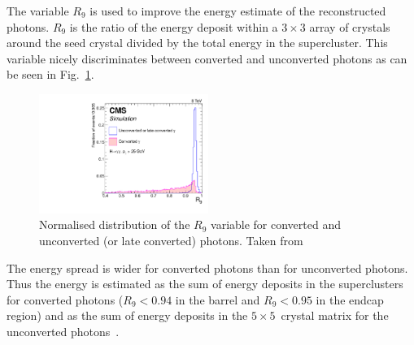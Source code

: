 The variable $R_9$ is used to improve the energy estimate of the reconstructed photons.
$R_9$ is the ratio of the energy deposit within a $3\times 3$ array of crystals around the seed crystal divided by the total energy in the supercluster.
This variable nicely discriminates between converted and unconverted photons as can be seen in Fig.~\ref{fig:PhotonR9}.
\begin{figure}[!t]
  \centering
      \includegraphics[width=0.49\textwidth]{figures/experiment/ObjectReconstruction/convUnconvR9Linear}
      \caption{Normalised distribution of the $R_9$ variable for converted and unconverted (or late converted) photons. Taken from~\cite{bib:CMS:PhotonIdentification_8TeV}}  
  \label{fig:PhotonR9}
\end{figure}
The energy spread is wider for converted photons than for unconverted photons.
Thus the energy is estimated as the sum of energy deposits in the superclusters for converted photons ($R_9<0.94$ in the barrel and $R_9<0.95$ in the endcap region) and as the sum of energy deposits in the $5\times5$~crystal matrix for the unconverted photons~\cite{bib:CMS:PhotonIdentification_8TeV}.


